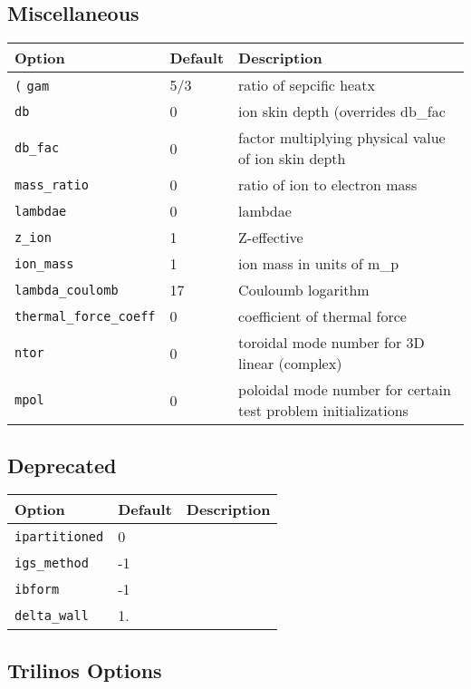 \subsection{Miscellaneous}

\begin{tabular}{llp{4.5in}}
  \textbf{Option}&\textbf{Default}&\textbf{Description}\\
  \hline
 \texttt(
 \texttt{gam}                    & 5/3 & ratio of sepcific heatx \\
 \texttt{db}                     & 0 & ion skin depth (overrides db\_fac \\
 \texttt{db\_fac}                & 0 & factor multiplying physical value of ion skin depth \\
 \texttt{mass\_ratio}            & 0 & ratio of ion to electron mass \\
 \texttt{lambdae}                & 0 & lambdae \\
 \texttt{z\_ion}                 & 1 & Z-effective \\
 \texttt{ion\_mass}              & 1 & ion mass in units of m\_p \\
 \texttt{lambda\_coulomb}         & 17 & Couloumb logarithm \\
 \texttt{thermal\_force\_coeff}  & 0 &  coefficient of thermal force \\
 \texttt{ntor}                   & 0 &  toroidal mode number for 3D linear (complex) \\
 \texttt{mpol}                   & 0 &  poloidal mode number for certain test problem initializations 

\end{tabular}

\subsection{Deprecated}

\begin{tabular}{llp{4.5in}}
  \textbf{Option}&\textbf{Default}&\textbf{Description}\\
  \hline
 \texttt{ipartitioned}   & 0 &     \\
 \texttt{igs\_method}    & -1&     \\
 \texttt{ibform}         & -1&     \\
 \texttt{delta\_wall}    & 1.&
\end{tabular}

\subsection{Trilinos Options}

